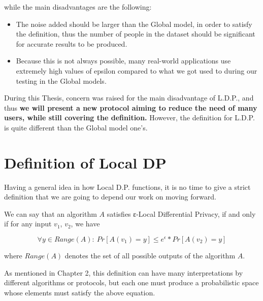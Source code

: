 while the main disadvantages are the following:

\begin{itemize}
    \item The noise added should be larger than the Global model, in order to satisfy the definition, thus the number of people in the dataset should be significant for accurate results to be produced.
    \item Because this is not always possible, many real-world applications use extremely high values of epsilon compared to what we got used to during our testing in the Global models.
\end{itemize}

During this Thesis, concern was raised for the main disadvantage of L.D.P., and thus\textbf{ we will present a new protocol aiming to reduce the need of many users, while still covering the definition.} However, the definition for L.D.P. is quite different than the Global model one's.

\section{Definition of Local DP}

Having a general idea in how Local D.P. functions, it is no time to give a strict definition that we are going to depend our work on moving forward.

We can say that an algorithm $A$ satisfies ε-Local Differential Privacy, if and only if for any input $v_1$, $v_2$, we have

$$ \forall y \in Range(A):\ Pr[A(v_1) = y] \leq e^{\epsilon} * Pr[A(v_2) = y] $$

where $Range(A)$ denotes the set of all possible outputs of the algorithm $A$.

As mentioned in Chapter 2, this definition can have many interpretations by different algorithms or protocols, but each one must produce a probabilistic space whose elements must satisfy the above equation.


